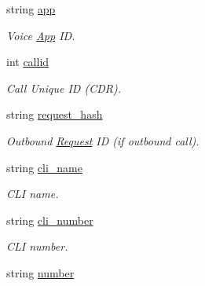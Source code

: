 \begin{DoxyCompactItemize}
\item 
string \hyperlink{class_thecallr_api_1_1_objects_1_1_real_time_1_1_request_a3679a1e4a3a2cadd4cd9b120b508d701}{app}
\begin{DoxyCompactList}\small\item\em Voice \hyperlink{namespace_thecallr_api_1_1_objects_1_1_app}{App} I\+D. \end{DoxyCompactList}\item 
int \hyperlink{class_thecallr_api_1_1_objects_1_1_real_time_1_1_request_ae9e65e0b9f9df536b066ef913f6fb687}{callid}
\begin{DoxyCompactList}\small\item\em Call Unique I\+D (C\+D\+R). \end{DoxyCompactList}\item 
string \hyperlink{class_thecallr_api_1_1_objects_1_1_real_time_1_1_request_aaeadcbd8def6779be7f6765234c7fe1c}{request\+\_\+hash}
\begin{DoxyCompactList}\small\item\em Outbound \hyperlink{class_thecallr_api_1_1_objects_1_1_real_time_1_1_request}{Request} I\+D (if outbound call). \end{DoxyCompactList}\item 
string \hyperlink{class_thecallr_api_1_1_objects_1_1_real_time_1_1_request_a184d3472cbd338b6c58e98578727ee42}{cli\+\_\+name}
\begin{DoxyCompactList}\small\item\em C\+L\+I name. \end{DoxyCompactList}\item 
string \hyperlink{class_thecallr_api_1_1_objects_1_1_real_time_1_1_request_a2e1a6f9393fb53a7dfba2476408815da}{cli\+\_\+number}
\begin{DoxyCompactList}\small\item\em C\+L\+I number. \end{DoxyCompactList}\item 
string \hyperlink{class_thecallr_api_1_1_objects_1_1_real_time_1_1_request_a944c8d2e0794ccc9f2eab565194cc6d6}{number}

\end{DoxyCompactItemize}

